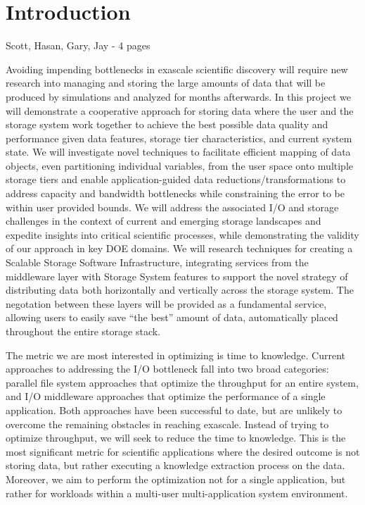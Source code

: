 \section*{Introduction} {\color{red} Scott, Hasan, Gary, Jay - 4 pages}
\label{sec:introduction}

Avoiding impending bottlenecks in exascale scientific discovery will require
new research into managing and storing the large amounts of data
that will be produced by simulations and analyzed for months
afterwards.
%
In this project we will demonstrate a cooperative approach for storing data
where the user and the storage system work together to achieve the best possible data
quality and performance given data features, storage tier characteristics,
and current system state. We will investigate novel techniques to facilitate efficient
mapping of data objects, even partitioning individual variables, from the user
space onto multiple storage tiers and enable application-guided data
reductions/transformations to address capacity and bandwidth bottlenecks while
constraining the error to be within user provided bounds.
%
We will address the associated I/O and storage challenges in the context of
current and emerging storage landscapes and expedite insights into critical
scientific processes, while demonstrating the validity of our approach in key DOE
domains. We will research techniques for creating a Scalable
Storage Software Infrastructure, integrating services from the middleware
layer with Storage System features to support the
novel strategy of distributing data both horizontally and vertically across the storage
system. 
The negotation between these layers will be provided as a fundamental service, 
allowing users to easily save ``the best'' amount of data, automatically placed
throughout the entire storage stack.

The metric we are most interested in optimizing is time to knowledge.
Current approaches to addressing the I/O bottleneck fall into two broad
categories: parallel file system approaches that optimize the throughput for
an entire system, and I/O middleware approaches that optimize the
performance of a single application. Both approaches have been successful to date, but
are unlikely to overcome the remaining obstacles in reaching exascale. Instead
of trying to optimize throughput, we will seek to reduce the time to
knowledge. This is the most significant metric for scientific applications
where the desired outcome is not storing data, but rather executing a
knowledge extraction process on the data. Moreover, we aim to perform the
optimization not for a single application, but rather for workloads within a
multi-user multi-application system environment.

